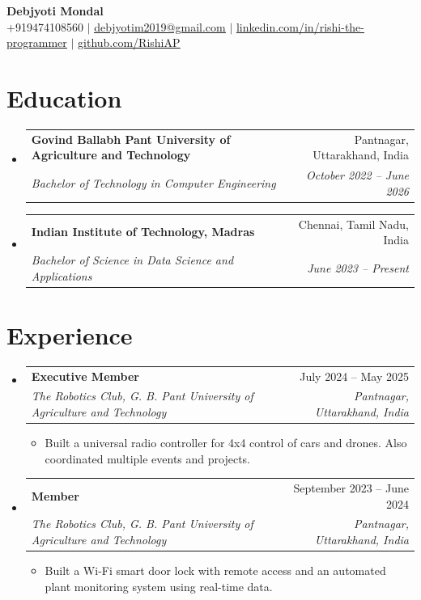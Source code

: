 \documentclass[letterpaper,11pt]{article}
\makeatletter
\newcommand{\resumeItem}[1]{
  \item\small{
    {#1 \vspace{-2pt}}
  }
}
\newcommand{\resumeSubheading}[4]{
  \vspace{-2pt}\item
    \begin{tabular*}{0.97\textwidth}[t]{l@{\extracolsep{\fill}}r}
      \textbf{#1} & #2 \\
      \textit{\small#3} & \textit{\small #4} \\
    \end{tabular*}\vspace{-7pt}
}
\newcommand{\resumeSubSubheading}[2]{
    \item
    \begin{tabular*}{0.97\textwidth}{l@{\extracolsep{\fill}}r}
      \textit{\small#1} & \textit{\small #2} \\
    \end{tabular*}\vspace{-7pt}
}
\newcommand{\resumeSubHeadingListStart}{\begin{itemize}[leftmargin=0.15in, label={}]}
\newcommand{\resumeSubHeadingListEnd}{\end{itemize}}
\newcommand{\resumeItemListStart}{\begin{itemize}}
\newcommand{\resumeItemListEnd}{\end{itemize}\vspace{-5pt}}
\makeatother
\begin{document}

\begin{center}
    {\Huge \textbf{Debjyoti Mondal}} \\ \vspace{1pt}
    \small +919474108560 $|$ \href{mailto:debjyotim2019@gmail.com}{\underline{debjyotim2019@gmail.com}} $|$ 
    \href{https://linkedin.com/in/rishi-the-programmer}{\underline{linkedin.com/in/rishi-the-programmer}} $|$
    \href{https://github.com/RishiAP}{\underline{github.com/RishiAP}}
\end{center}


\section{Education}
  \resumeSubHeadingListStart
    \resumeSubheading
      {Govind Ballabh Pant University of Agriculture and Technology}{Pantnagar, Uttarakhand, India}
      {Bachelor of Technology in Computer Engineering}{October 2022 -- June 2026}
    \resumeSubheading
      {Indian Institute of Technology, Madras}{Chennai, Tamil Nadu, India}
      {Bachelor of Science in Data Science and Applications}{June 2023 -- Present}
  \resumeSubHeadingListEnd


\section{Experience}
  \resumeSubHeadingListStart

    \resumeSubheading
      {Executive Member}{July 2024 -- May 2025}
      {The Robotics Club, G. B. Pant University of Agriculture and Technology}{Pantnagar, Uttarakhand, India}
      \resumeItemListStart
      \resumeItem{Built a universal radio controller for 4x4 control of cars and drones. Also coordinated multiple events and projects.}
      \resumeItemListEnd
      

    \resumeSubheading
      {Member}{September 2023 -- June 2024}
      {The Robotics Club, G. B. Pant University of Agriculture and Technology}{Pantnagar, Uttarakhand, India}
      \resumeItemListStart
        \resumeItem{Built a Wi-Fi smart door lock with remote access and an automated plant monitoring system using real-time data.}
      \resumeItemListEnd
  \resumeSubHeadingListEnd
\end{document}
